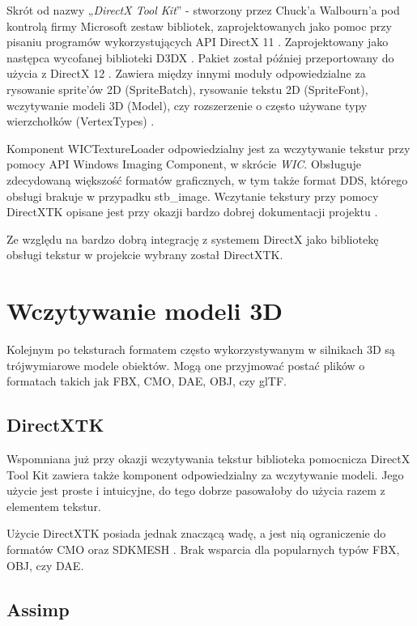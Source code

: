 Skrót od nazwy „\emph{DirectX Tool Kit}'' - stworzony przez Chuck'a
Walbourn'a pod kontrolą firmy Microsoft zestaw bibliotek,
zaprojektowanych jako pomoc przy pisaniu programów wykorzystujących API
DirectX 11 \cite{github:directxtk:2024}. Zaprojektowany jako następca wycofanej biblioteki
D3DX \cite{walbourn:directxtk:2024}. Pakiet został później przeportowany do użycia z DirectX
12 \cite{github:directxtk12:2024}. Zawiera między innymi moduły odpowiedzialne za rysowanie
sprite'ów 2D (SpriteBatch), rysowanie tekstu 2D (SpriteFont),
wczytywanie modeli 3D (Model), czy rozszerzenie o często używane typy
wierzchołków (VertexTypes) \cite{walbourn:directxtk:2024}.

Komponent WICTextureLoader odpowiedzialny jest za wczytywanie tekstur
przy pomocy API Windows Imaging Component, w skrócie \emph{WIC}. Obsługuje zdecydowaną większość formatów graficznych, w tym także format
DDS, którego obsługi brakuje w przypadku stb\_image. Wczytanie tekstury przy pomocy DirectXTK opisane jest przy okazji bardzo
dobrej dokumentacji projektu \cite{github:directxtk:sprites:2024}.

Ze względu na bardzo dobrą integrację z systemem DirectX jako bibliotekę
obsługi tekstur w projekcie wybrany został DirectXTK.

\section{Wczytywanie modeli 3D}

Kolejnym po teksturach formatem często wykorzystywanym w silnikach 3D są
trójwymiarowe modele obiektów. Mogą one przyjmować postać plików o
formatach takich jak FBX, CMO, DAE, OBJ, czy glTF.

\subsection{DirectXTK}

Wspomniana już przy okazji wczytywania tekstur biblioteka pomocnicza
DirectX Tool Kit zawiera także komponent odpowiedzialny za wczytywanie
modeli. Jego użycie jest proste i intuicyjne, do tego dobrze pasowałoby
do użycia razem z elementem tekstur.

Użycie DirectXTK posiada jednak znaczącą wadę, a jest nią ograniczenie
do formatów CMO oraz SDKMESH \cite{github:directxtk:model:2024}. Brak wsparcia dla popularnych
typów FBX, OBJ, czy DAE.

\subsection{Assimp}

